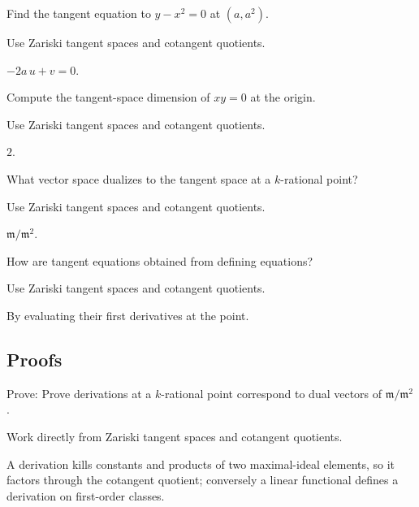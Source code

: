 \begin{exercise}\label{exr:vi32-expand-02}
Find the tangent equation to $y-x^2=0$ at $(a,a^2)$.
\end{exercise}
\begin{hint}
Use Zariski tangent spaces and cotangent quotients.
\end{hint}
\begin{solution}
$-2a\,u+v=0$.
\end{solution}

\begin{exercise}\label{exr:vi32-expand-03}
Compute the tangent-space dimension of $xy=0$ at the origin.
\end{exercise}
\begin{hint}
Use Zariski tangent spaces and cotangent quotients.
\end{hint}
\begin{solution}
$2$.
\end{solution}

\begin{exercise}[Cotangent]\label{exr:vi32-expand-04}
What vector space dualizes to the tangent space at a $k$-rational point?
\end{exercise}
\begin{hint}
Use Zariski tangent spaces and cotangent quotients.
\end{hint}
\begin{solution}
$\mathfrak m/\mathfrak m^2$.
\end{solution}

\begin{exercise}[Jacobian]\label{exr:vi32-expand-05}
How are tangent equations obtained from defining equations?
\end{exercise}
\begin{hint}
Use Zariski tangent spaces and cotangent quotients.
\end{hint}
\begin{solution}
By evaluating their first derivatives at the point.
\end{solution}

\subsection*{Proofs}

\begin{exercise}\label{exr:vi32-expand-06}
Prove: Prove derivations at a $k$-rational point correspond to dual vectors of $\mathfrak m/\mathfrak m^2$.
\end{exercise}
\begin{hint}
Work directly from Zariski tangent spaces and cotangent quotients.
\end{hint}
\begin{solution}
A derivation kills constants and products of two maximal-ideal elements, so it factors through the cotangent quotient; conversely a linear functional defines a derivation on first-order classes.
\end{solution}

